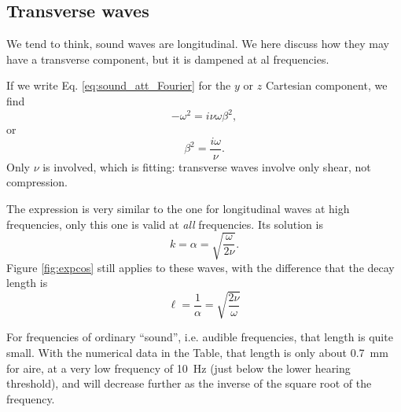 \subsection{Transverse waves}

We tend to think, sound waves are longitudinal. We here discuss how
they may have a transverse component, but it is dampened at al
frequencies.

If we write Eq. \ref{eq:sound_att_Fourier} for the $y$ or $z$
Cartesian component, we find
\[
-\omega^2 =  i \nu \omega \beta^2 ,
\]
or
\[
\beta^2 = \frac{i \omega}{\nu}.
\]
Only $\nu$ is involved, which is fitting: transverse waves involve
only shear, not compression.

The expression is very similar to the one for longitudinal waves at
high frequencies, only this one is valid at \emph{all} frequencies.
Its solution is
\[
k = \alpha = \sqrt{ \frac{\omega}{ 2 \nu}}.
\]
Figure \ref{fig:expcos} still applies to these waves, with the
difference that the decay length is
\[
\ell= \frac{1}{\alpha}=\sqrt{\frac{ 2 \nu}{\omega}}
\]

For frequencies of ordinary ``sound'', i.e. audible frequencies, that
length is quite small. With the numerical data in the Table, that
length is only about \SI{0.7}{\milli\meter} for aire, at a very low
frequency of \SI{10}{\hertz} (just below the lower hearing threshold),
and will decrease further as the inverse of the square root of the
frequency.




